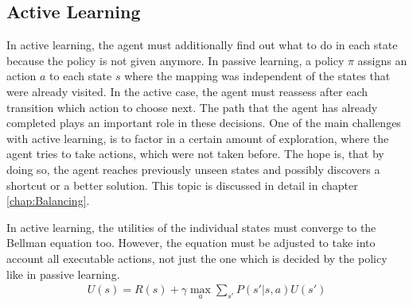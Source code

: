 \documentclass{llncs}
\begin{document}
\subsection{Active Learning}
In active learning, the agent must additionally find out what to do in each state because the policy is not given anymore. In passive learning, a policy $\pi$ assigns an action $a$ to each state $s$ where the mapping was independent of the states that were already visited. In the active case, the agent must reassess after each transition which action to choose next. The path that the agent has already completed plays an important role in these decisions. One of the main challenges with active learning, is to factor in a certain amount of exploration, where the agent tries to take actions, which were not taken before. The hope is, that by doing so, the agent reaches previously unseen states and possibly discovers a shortcut or a better solution. This topic is discussed in detail in chapter \ref{chap:Balancing}.\par

In active learning, the utilities of the individual states must converge to the Bellman equation too. However, the equation must be adjusted to take into account all executable actions, not just the one which is decided by the policy like in passive learning.
\begin{align*}
	U(s)=R(s)+\gamma\max_{a}\sum_{s'}P(s'|s,a)U(s')
\end{align*}



\end{document}
